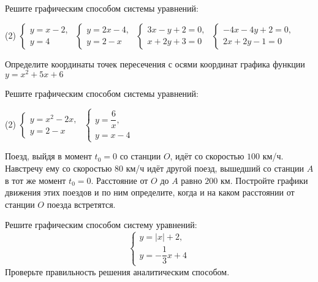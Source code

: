 \begin{class}[number=7]
	\begin{listofex}
		\item Решите графическим способом системы уравнений:
		\begin{tasks}(2)
			\task \( \begin{cases} y=x-2,\\y=4 \end{cases} \)
			\task \( \begin{cases} y=2x-4,\\y=2-x \end{cases} \)
			\task \( \begin{cases} 3x-y+2=0,\\x+2y+3=0 \end{cases} \)
			\task \( \begin{cases} -4x-4y+2=0,\\2x+2y-1=0 \end{cases} \)
		\end{tasks}
		\item Определите координаты точек пересечения с осями координат графика функции \( y=x^2+5x+6 \)
		\item Решите графическим способом системы уравнений:
		\begin{tasks}(2)
			\task \( \begin{cases} y=x^2-2x,\\y=2-x \end{cases} \)
			\task \( \begin{cases} y=\dfrac{6}{x},\\y=x-4 \end{cases} \)
		\end{tasks}
		\item Поезд, выйдя в момент \( t_0=0 \) со станции \( O \), идёт со скоростью \( 100 \) км/ч. Навстречу ему со скоростью \( 80 \) км/ч идёт другой поезд, вышедший со станции \( A \) в тот же момент \( t_0=0 \). Расстояние от \( O \) до \( A \) равно \( 200 \) км. Постройте графики движения этих поездов и по ним определите, когда и на каком расстоянии от станции \( O \) поезда встретятся.
		\item Решите графическим способом систему уравнений:
		\[ \begin{cases} y=|x|+2,\\y=-\dfrac{1}{3}x+4 \end{cases} \]
		Проверьте правильность решения аналитическим способом.
	\end{listofex}
\end{class}

